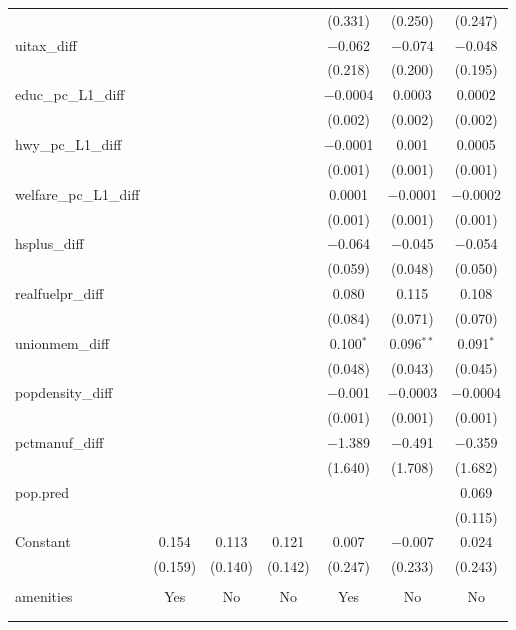 \begin{table}[!htbp]
\begin{tabular}{@{\extracolsep{5pt}}lcccccc}
  &  &  &  & (0.331) & (0.250) & (0.247) \\ 
  uitax\_diff &  &  &  & $-$0.062 & $-$0.074 & $-$0.048 \\ 
  &  &  &  & (0.218) & (0.200) & (0.195) \\ 
  educ\_pc\_L1\_diff &  &  &  & $-$0.0004 & 0.0003 & 0.0002 \\ 
  &  &  &  & (0.002) & (0.002) & (0.002) \\ 
  hwy\_pc\_L1\_diff &  &  &  & $-$0.0001 & 0.001 & 0.0005 \\ 
  &  &  &  & (0.001) & (0.001) & (0.001) \\ 
  welfare\_pc\_L1\_diff &  &  &  & 0.0001 & $-$0.0001 & $-$0.0002 \\ 
  &  &  &  & (0.001) & (0.001) & (0.001) \\ 
  hsplus\_diff &  &  &  & $-$0.064 & $-$0.045 & $-$0.054 \\ 
  &  &  &  & (0.059) & (0.048) & (0.050) \\ 
  realfuelpr\_diff &  &  &  & 0.080 & 0.115 & 0.108 \\ 
  &  &  &  & (0.084) & (0.071) & (0.070) \\ 
  unionmem\_diff &  &  &  & 0.100$^{*}$ & 0.096$^{**}$ & 0.091$^{*}$ \\ 
  &  &  &  & (0.048) & (0.043) & (0.045) \\ 
  popdensity\_diff &  &  &  & $-$0.001 & $-$0.0003 & $-$0.0004 \\ 
  &  &  &  & (0.001) & (0.001) & (0.001) \\ 
  pctmanuf\_diff &  &  &  & $-$1.389 & $-$0.491 & $-$0.359 \\ 
  &  &  &  & (1.640) & (1.708) & (1.682) \\ 
  pop.pred &  &  &  &  &  & 0.069 \\ 
  &  &  &  &  &  & (0.115) \\ 
  Constant & 0.154 & 0.113 & 0.121 & 0.007 & $-$0.007 & 0.024 \\ 
  & (0.159) & (0.140) & (0.142) & (0.247) & (0.233) & (0.243) \\ 
 \hline \\[-1.8ex] 
amenities & Yes & No & No & Yes & No & No \\ 
\hline \\[-1.8ex] 
\hline 
\hline \\[-1.8ex] 
\end{tabular} 
\end{table} 
